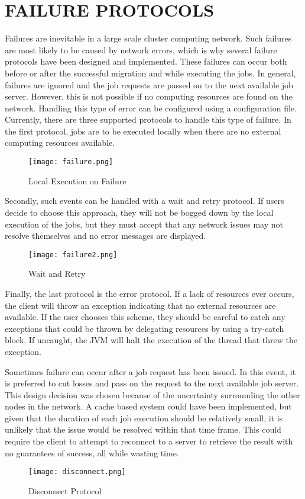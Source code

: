 \section{FAILURE PROTOCOLS}\label{sec:conclusions}

Failures are inevitable in a large scale cluster computing network.
Such failures are most likely to be caused by network errors, which
is why several failure protocols have been designed and implemented.
These failures can occur both before or after the successful
migration and while executing the jobs.
In general, failures are ignored and the job requests are passed
on to the next available job server.
However, this is not possible if no computing resources are
found on the network.
Handling this type of error can be configured
using a configuration file.
Currently, there are three supported protocols to handle
this type of failure.
In the first protocol, jobs are to be executed locally when
there are no external computing resources available.

\begin{figure}[H]
    \centering
    \texttt{[image: failure.png]}
    \caption{Local Execution on Failure}
\end{figure}

Secondly, such events can be handled with a wait and retry protocol.
If users decide to choose this approach, they will not be bogged down
by the local execution of the jobs, but they must accept that any network
issues may not resolve themselves and no error messages are displayed.

\begin{figure}[H]
    \centering
    \texttt{[image: failure2.png]}
    \caption{Wait and Retry}
\end{figure}

Finally, the last protocol is the error protocol.
If a lack of resources ever occurs, the client will
throw an exception indicating that no external resources
are available.
If the user chooses this scheme, they should be careful
to catch any exceptions that could be thrown by delegating
resources by using a try-catch block.
If uncaught, the JVM will halt the execution of the thread
that threw the exception.

Sometimes failure can occur after a job request has been issued.
In this event, it is preferred to cut losses and pass on the request
to the next available job server.
This design decision was chosen because of the uncertainty surrounding
the other nodes in the network.
A cache based system could have been implemented, but given that the duration
of each job execution should be relatively small, it is unlikely that the issue
would be resolved within that time frame.
This could require the client to attempt to reconnect to a server to retrieve
the result with no guarantees of success, all while wasting time.

\begin{figure}[H]
    \centering
    \texttt{[image: disconnect.png]}
    \caption{Disconnect Protocol}
\end{figure}
